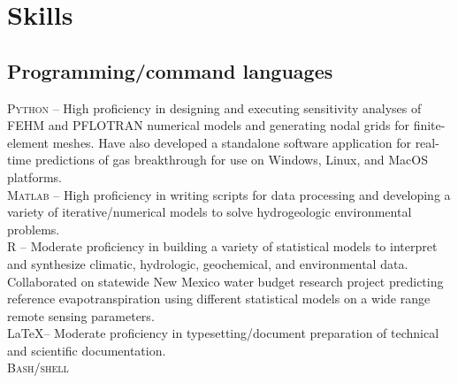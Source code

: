 \documentclass[11pt, letterpaper]{article}
\begin{document}
\section*{Skills}
\subsection*{Programming/command languages}
\noindent
\textsc{Python} – High proficiency in designing and executing sensitivity analyses of FEHM and PFLOTRAN numerical models and generating nodal grids for finite-element meshes. Have also developed a standalone software application for real-time predictions of gas breakthrough for use on Windows, Linux, and MacOS platforms.\\[5pt]
\textsc{Matlab} – High proficiency in writing scripts for data processing and developing a variety of iterative/numerical models to solve hydrogeologic environmental problems.\\[5pt]
\textsc{R} – Moderate proficiency in building a variety of statistical models to interpret and synthesize climatic, hydrologic, geochemical, and environmental data. Collaborated on statewide New Mexico water budget research project predicting reference evapotranspiration using different statistical models on a wide range remote sensing parameters.\\[5pt]
\LaTeX – Moderate proficiency in typesetting/document preparation of technical and scientific documentation. \\[5pt]
\textsc{Bash/shell}
\end{document}
